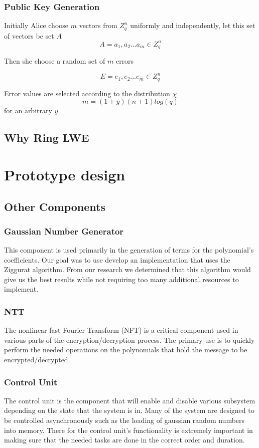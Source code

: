 \documentclass{article}
\begin{document}
\subsubsection{Public Key Generation}
Initially Alice choose $m$ vectors from $Z_q^n$ uniformly and independently, let this set of vectors be set $A$
\begin{equation*}
A = a_1, a_2… a_m \in Z_q^n
\end{equation*}

Then she choose a random set of $m$ errors

\begin{equation*}
E = e_1, e_2… e_m \in Z_q^n
\end{equation*}

Error values are selected according to the distribution $\chi$
\begin{equation*}
m = (1+y)(n+1)log(q) 
\end{equation*}
for an arbitrary $y$


\subsection{Why Ring LWE}

\section{Prototype design}
\subsection{Other Components}
\subsubsection{Gaussian Number Generator}
This component is used primarily in the generation of terms for the polynomial’s coefficients. Our goal was to use develop an implementation that uses the Ziggurat algorithm. From our research we determined that this algorithm would give us the best results while not requiring too many additional resources to implement. 
\subsubsection{NTT}
The nonlinear fast Fourier Transform (NFT) is a critical component used in various parts of the encryption/decryption process. The primary use is to quickly perform the needed operations on the polynomials that hold the message to be encrypted/decrypted.
\subsubsection{Control Unit}
The control unit is the component that will enable and disable various subsystem depending on the state that the system is in. Many of the system are designed to be controlled asynchronously such as the loading of gaussian random numbers into memory. There for the control unit's functionality is extremely important in making sure that the needed tasks are done in the correct order and duration.
\end{document}
